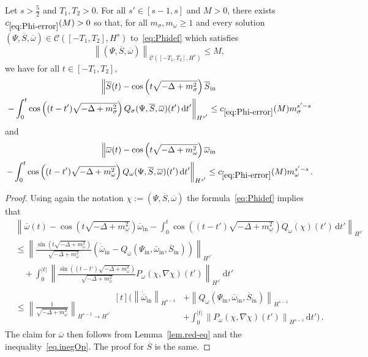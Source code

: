 \documentclass[AHL,Unicode,longabstracts,published]{cedram}
\newcommand{\rmin}{\mathrm{in}}
\newcommand{\cC}{\mathcal{C}}
\renewcommand\d[1]{{\ensuremath{\,\text{d}#1}}}
\begin{document}
\begin{lemm}\label{lem:Phi-error}
Let $s>\tfrac52$ and $T_1,T_2>0$. For all $s'\in[s-1,s]$ and $M>0$, there exists $c_{\eqref{eq:Phi-error}}(M)>0$ so that, for all $m_\sigma, m_\omega\geq 1$ and every solution $(\Psi, \overline{S}, \overline{\omega})\in\cC([-T_1,T_2],H^s)$ to~\eqref{eq:Phidef} which satisfies
\begin{equation*}
\left\|(\Psi, \overline{S}, \overline{\omega})\right\|_{\cC\left([-T_1,T_2],H^s\right)}\leq M,
\end{equation*}
we have for all $t\in [-T_1,T_2]$,
\begin{multline}\label{eq:Phi-error}
\left\|\overline{S}(t) - \cos\left(t\sqrt{-\Delta + m^2_\sigma}\right)\overline{S}_\rmin\right.\\
\left. - \int_0^t\cos\left((t-t')\sqrt{-\Delta + m^2_\sigma}\right) Q_\sigma(\Psi, \overline{S}, \overline{\omega})(t')\d t'\right\|_{H^{s'}}
\leq c_{\eqref{eq:Phi-error}}(M)m_\sigma^{s'-s}\\
\end{multline}
and
\begin{multline*}
\left\|\overline{\omega}(t)-\cos\left(t\sqrt{-\Delta + m^2_\omega}\right)\overline\omega_\rmin\right.\\
\left. - \int_0^t\cos\left((t-t')\sqrt{-\Delta + m^2_\omega}\right) Q_\omega(\Psi, \overline{S}, \overline{\omega})(t')\d t'\right\|_{H^{s'}}
\leq c_{\eqref{eq:Phi-error}}(M)m_\omega^{s'-s}\,.
\end{multline*}
\end{lemm}

\begin{proof}
Using again the notation $\chi:=(\Psi, \overline{S}, \overline{\omega})$ the formula~\eqref{eq:Phidef} implies that
\begin{align*}
&\left\|\overline{\omega}(t)-\cos\left(t\sqrt{-\Delta + m^2_\omega}\right)\overline\omega_\rmin - \int_0^t\cos\left((t-t')\sqrt{-\Delta + m^2_\omega}\right) Q_\omega(\chi)(t')\d t'\right\|_{H^{s'}}\\
&\leq
\left\|
\frac{\sin\left(t\sqrt{-\Delta + m^2_\omega}\right)}{\sqrt{-\Delta + m^2_\omega}}\left(\dot{\overline{\omega}}_\rmin- Q_\omega(\Psi_\rmin, \overline{\omega}_\rmin, \overline{S}_\rmin)\right)\right\|_{H^{s'}}\\
&\quad+
\int_0^{|t|}
\left\|
\frac{\sin\left((t-t')\sqrt{-\Delta + m^2_\omega}\right)}{\sqrt{-\Delta + m^2_\omega}}P_\omega(\chi, \nabla \chi)(t')
\right\|_{H^{s'}}
\d t' \\
&\leq
\left\|\frac{1}{\sqrt{-\Delta+m_\omega^2}}\right\|_{H^{s-1}\to H^{s'}}
\begin{aligned}[t]\Bigg(
\left\|
\dot{\overline{\omega}}_\rmin\right\|_{H^{s-1}} &+\left\|Q_\omega(\Psi_\rmin, \overline{\omega}_\rmin, \overline{S}_\rmin)\right\|_{{H}^{s-1}}\\
&+\int_0^{|t|}
\left\|P_\omega(\chi, \nabla \chi)(t')\right\|_{H^{s-1}}
\d t'
\Bigg)\,.
\end{aligned}
\end{align*}
The claim for $\overline{\omega}$ then follows from Lemma~\ref{lem.red-eq} and the inequality~\eqref{eq.inegOp}. The proof for $\overline{S}$ is the same.
\end{proof}
\end{document}
